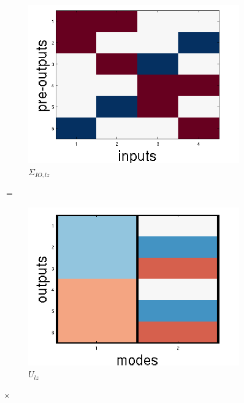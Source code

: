\documentclass[10pt,letterpaper]{article}
\begin{document}
\begin{figure}
\centering
\begin{subfigure}{0.22\textwidth}
\includegraphics[width=\textwidth]{figures/linearized_IO.png}
\caption{$\Sigma_{IO,lz}$}
\end{subfigure}
\huge{$=$}
\begin{subfigure}{0.22\textwidth}
\includegraphics[width=\textwidth]{figures/U_lz.png}
\caption{$U_{lz}$}
\end{subfigure}
\LARGE{$\times$}
\begin{subfigure}{0.22\textwidth}

\end{subfigure}
\end{figure}
\end{document}
